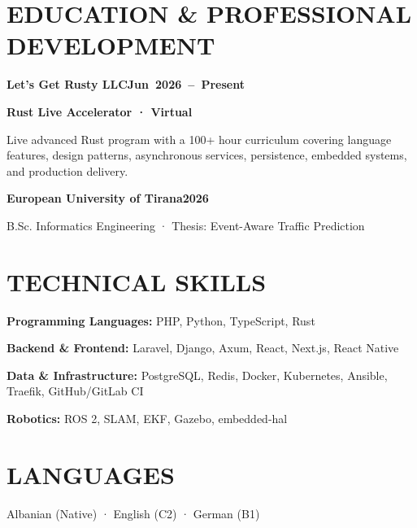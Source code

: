 \documentclass[10pt,a4paper]{article}
\newcommand{\entry}[2]{\Needspace{5\baselineskip}\par\addvspace{5pt}\noindent\textbf{#1}\hfill\mbox{\textbf{#2}}\par}
\begin{document}
\section*{EDUCATION \& PROFESSIONAL DEVELOPMENT}
\entry{Let's Get Rusty LLC}{Jun 2026 – Present}
\textbf{Rust Live Accelerator · Virtual}\par
Live advanced Rust program with a 100+ hour curriculum covering language features, design patterns, asynchronous services, persistence, embedded systems, and production delivery.\par
\entry{European University of Tirana}{2026}
B.Sc. Informatics Engineering · Thesis: Event-Aware Traffic Prediction\par
\section*{TECHNICAL SKILLS}
\textbf{Programming Languages:} PHP, Python, TypeScript, Rust\par
\textbf{Backend \& Frontend:} Laravel, Django, Axum, React, Next.js, React Native\par
\textbf{Data \& Infrastructure:} PostgreSQL, Redis, Docker, Kubernetes, Ansible, Traefik, GitHub/GitLab CI\par
\textbf{Robotics:} ROS 2, SLAM, EKF, Gazebo, embedded-hal\par
\section*{LANGUAGES}
Albanian (Native) · English (C2) · German (B1)\par
\end{document}

